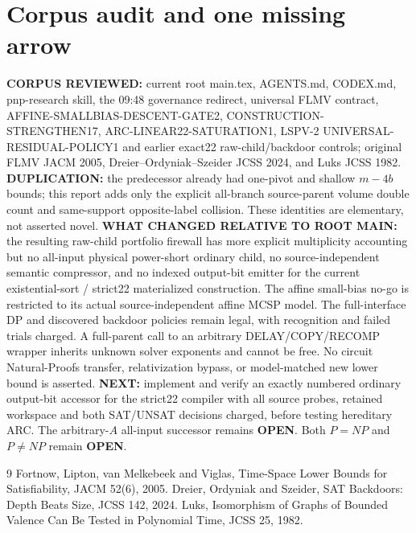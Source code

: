 \documentclass[11pt]{article}
\begin{document}
\section{Corpus audit and one missing arrow}
\textbf{CORPUS REVIEWED:} current root main.tex, AGENTS.md, CODEX.md,
pnp-research skill, the 09:48 governance redirect, universal FLMV
contract, AFFINE-SMALLBIAS-DESCENT-GATE2,
CONSTRUCTION-STRENGTHEN17, ARC-LINEAR22-SATURATION1,
LSPV-2 UNIVERSAL-RESIDUAL-POLICY1 and earlier exact22
raw-child/backdoor controls; original FLMV JACM 2005,
Dreier--Ordyniak--Szeider JCSS 2024, and Luks JCSS 1982.
\textbf{DUPLICATION:} the predecessor already had one-pivot and
shallow $m-4b$ bounds; this report adds only the explicit all-branch
source-parent volume double count and same-support opposite-label
collision. These identities are elementary, not asserted novel.
\textbf{WHAT CHANGED RELATIVE TO ROOT MAIN:}
the resulting raw-child portfolio firewall has more explicit
multiplicity accounting but no all-input physical power-short
ordinary child, no source-independent semantic compressor, and
no indexed output-bit emitter for the current existential-sort /
strict22 materialized construction. The affine small-bias no-go
is restricted to its actual source-independent affine MCSP model.
The full-interface DP and discovered backdoor policies remain
legal, with recognition and failed trials charged.
A full-parent call to an arbitrary DELAY/COPY/RECOMP wrapper
inherits unknown solver exponents and cannot be free.
No circuit Natural-Proofs transfer, relativization bypass,
or model-matched new lower bound is asserted.
\textbf{NEXT:} implement and verify an exactly numbered
ordinary output-bit accessor for the strict22 compiler
with all source probes, retained workspace and both SAT/UNSAT
decisions charged, before testing hereditary ARC.
The arbitrary-$A$ all-input successor remains \textbf{OPEN}.
Both $P=NP$ and $P\ne NP$ remain \textbf{OPEN}.
\begin{thebibliography}{9}
 Fortnow, Lipton, van Melkebeek and Viglas,
Time-Space Lower Bounds for Satisfiability, JACM 52(6), 2005.
 Dreier, Ordyniak and Szeider,
SAT Backdoors: Depth Beats Size, JCSS 142, 2024.
 Luks, Isomorphism of Graphs of Bounded Valence
Can Be Tested in Polynomial Time, JCSS 25, 1982.
\end{thebibliography}
\end{document}
